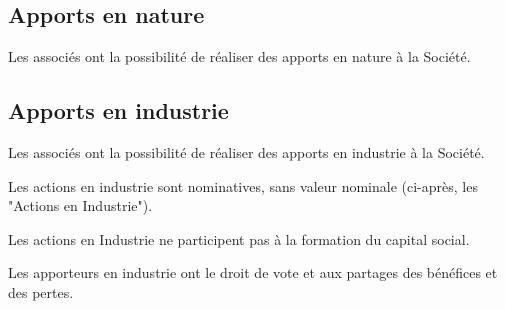 \documentclass[a4paper,12pt]{report}
\begin{document}
\subsection{Apports en nature}
Les associés ont la possibilité de réaliser des apports en nature à la Société.

%
%
%
%
%
%
%

\subsection{Apports en industrie}

Les associés ont la possibilité de réaliser des apports en industrie à la Société.

Les actions en industrie sont nominatives, sans valeur nominale (ci-après, les "Actions en Industrie").

Les actions en Industrie ne participent pas à la formation du capital social.

Les apporteurs en industrie ont le droit de vote et aux partages des bénéfices et des pertes.

%
\end{document}
